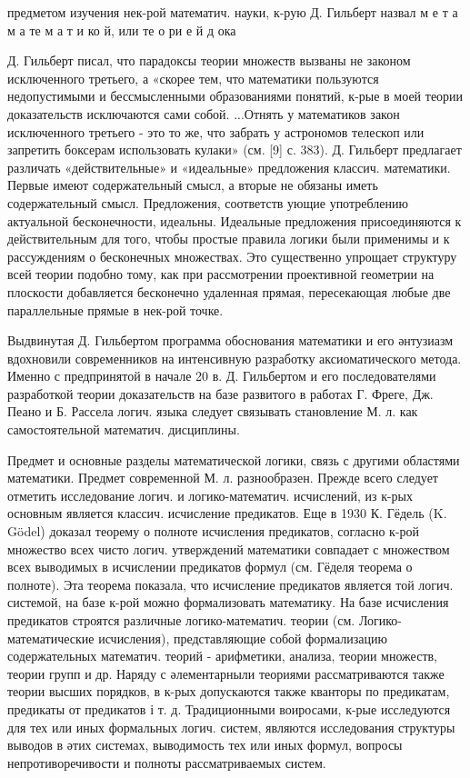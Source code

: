 \documentclass[10pt]{article}
\begin{document}
предметом изучения нек-рой математич. науки, к-рую Д. Гильберт назвал м е т а м а те м а т и ко й, или те о ри е й д ока



Д. Гильберт писал, что парадоксы теории множеств вызваны не законом исключенного третьего, а «скорее тем, что математики пользуются недопустимыми и бессмысленными образованиями понятий, к-рые в моей теории доказательств исключаются сами собой. ...Отнять у математиков закон исключенного третьего - это то же, что забрать у астрономов телескоп или запретить боксерам использовать кулаки» (см. [9] с. 383). Д. Гильберт предлагает различать «действительные» и «идеальные» предложения классич. математики. Первые имеют содержательный смысл, а вторые не обязаны иметь содержательный смысл. Предложения, соответств ующие употреблению актуальной бесконечности, идеальны. Идеальные предложения присоединяются к действительным для того, чтобы простые правила логики были применимы и к рассуждениям о бесконечных множествах. Это существенно упрощает структуру всей теории подобно тому, как при рассмотрении проективной геометрии на плоскости добавляется бесконечно удаленная прямая, пересекающая любые две параллельные прямые в нек-рой точке.



Выдвинутая Д. Гильбертом программа обоснования математики и его әнтузиазм вдохновили современников на интенсивную разработку аксиоматического метода. Именно с предпринятой в начале 20 в. Д. Гильбертом и его последователями разработкой теории доказательств на базе развитого в работах Г. Фреге, Дж. Пеано и Б. Рассела логич. языка следует связывать становление М. л. как самостоятельной математич. дисциплины.



Предмет и основные разделы математической логики, связь с другими областями математики. Предмет современной М. л. разнообразен. Прежде всего следует отметить исследование логич. и логико-математич. исчислений, из к-рых основным является классич. исчисление предикатов. Еще в 1930 К. Гёдель (K. Gödel) доказал теорему о полноте исчисления предикатов, согласно к-рой множество всех чисто логич. утверждений математики совпадает с множеством всех выводимых в исчислении предикатов формул (см. Гёделя теорема о полноте). Эта теорема показала, что исчисление предикатов является той логич. системой, на базе к-рой можно формализовать математику. На базе исчисления предикатов строятся различные логико-математич. теории (см. Логико-математические исчисления), представляющие собой формализацию содержательных математич. теорий - арифметики, анализа, теории множеств, теории групп и др. Наряду с әлементарныли теориями рассматриваются также теории высших порядков, в к-рых допускаются также кванторы по предикатам, предикаты от предикатов і т. д. Традиционными воиросами, к-рые исследуются для тех или иных формальных логич. систем, являются исследования структуры выводов в әтих системах, выводимость тех или иных формул, вопросы непротиворечивости и полноты рассматриваемых систем.
\end{document}
